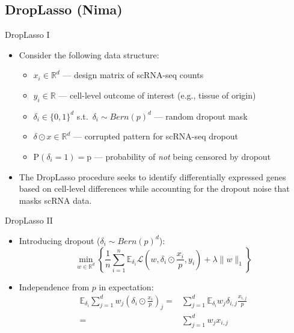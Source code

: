 \documentclass{beamer}
\newcommand{\R}{\mathbb{R}}
\newcommand{\E}{\mathbb{E}}
\newcommand{\lik}{\mathcal{L}}
\begin{document}
\subsection{DropLasso (Nima)}

\begin{frame}{DropLasso I}

\begin{itemize}
  \itemsep12pt
  \item Consider the following data structure:
    \begin{itemize}
      \itemsep10pt
      \item $x_i \in \mathbb{R}^d$ --- design matrix of scRNA-seq counts
      \item $y_i \in \mathbb{R}$ --- cell-level outcome of interest (e.g.,
        tissue of origin)
      \item $\delta_i \in \{0, 1\}^d$ s.t.~$\delta_i \sim Bern(p)^d$ --- random
        dropout mask
      \item $\delta \odot x \in \mathbb{R}^d$ --- corrupted pattern for
        scRNA-seq dropout
      \item $\text{P}(\delta_i = 1) = \text{p}$ --- probability of \textit{not}
        being censored by dropout
    \end{itemize}
  \item The DropLasso procedure seeks to identify differentially expressed genes
    based on cell-level differences while accounting for the dropout noise that
    masks scRNA data.
\end{itemize}

\end{frame}


\begin{frame}{DropLasso II}

\begin{itemize}
  \itemsep12pt
  \item Introducing dropout ($\delta_i \sim Bern(p)^d$):
    \[
      \min_{w \in \R^d} \left\{ \frac{1}{n} \sum_{i = 1}^n \E_{\delta_i}
        \lik \left(w, \delta_i \odot \frac{x_i}{p}, y_i \right) + \lambda
        \lVert w \rVert_1 \right\}
    \]
  \item Independence from $p$ in expectation:
    \[
      \begin{aligned}
      \E_{\delta_i} \sum_{j = 1}^{d} w_j \left( \delta_i \odot \frac{x_i}{p}
      \right)_j =& \sum_{j = 1}^d \E_{\delta_i} w_j \delta_{i,j}
      \frac{x_{i,j}}{p} \\ =& \sum_{j = 1}^d w_j x_{i,j}
      \end{aligned}
    \]
\end{itemize}

\end{frame}
\end{document}
